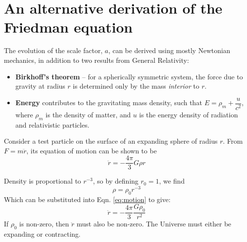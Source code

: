 \documentclass[11pt,a4paper]{book}
\begin{document}
\hypertarget{sec:alt_friedman}{%
\section{An alternative derivation of the Friedman equation}\label{sec:alt_friedman}}

The evolution of the scale factor, \(a\), can be derived using mostly
Newtonian mechanics, in addition to two results from General Relativity:

\begin{itemize}
\item
  \textbf{Birkhoff's theorem} -- for a spherically symmetric system, the
  force due to gravity at radius \(r\) is determined only by the mass
  \emph{interior} to \(r\).
\item
  \textbf{Energy} contributes to the gravitating mass density, such that
  \(E = \rho_m + \dfrac{u}{c^2}\), where \(\rho_m\) is the density of
  matter, and \(u\) is the energy density of radiation and relativistic
  particles.
\end{itemize}

Consider a test particle on the surface of an expanding sphere of radius
\(r\). From \(F= m \ddot{r}\), its equation of motion can be shown to be
\begin{equation}
    \ddot{r} = -\dfrac{4\pi}{3} G \rho r
\label{eq:motion}
\end{equation}

Density is proportional to \(r^{-3}\), so by defining \(r_{0} = 1\), we find
\[\rho = \rho_{0}r^{-3}\] Which can be substituted into Eqn. \eqref{eq:motion} to give:
\begin{equation}
    \ddot{r} = -\dfrac{4\pi}{3}\dfrac{G\rho_0}{r^2}
\label{eq:ddot-r-1}
\end{equation}
If \(\rho_0\) is
non-zero, then \(\ddot{r}\) must also be non-zero. The Universe must
either be expanding or contracting.
\end{document}

